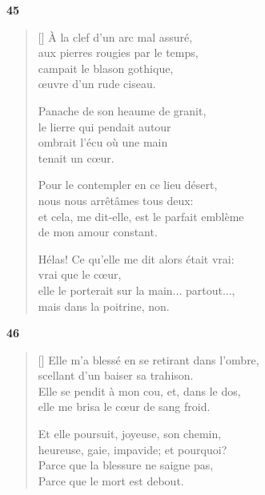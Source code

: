 \documentclass[a4paper,12pt]{book}
\begin{document}
\bigskip

\begin{center}
  \textbf{45}
\end{center}

\settowidth{\versewidth}{Panache de son heaume de granit,}

\begin{verse}[\versewidth]
  À la clef d'un arc mal assuré, \\
  aux pierres rougies par le temps, \\
  campait le blason gothique, \\
  œuvre d'un rude ciseau.

  Panache de son heaume de granit, \\
  le lierre qui pendait autour \\
  ombrait l'écu où une main \\
  tenait un cœur.

  Pour le contempler en ce lieu désert, \\
  nous nous arrêtâmes tous deux: \\
  et cela, me dit-elle, est le parfait emblème \\
  de mon amour constant.

  Hélas! Ce qu'elle me dit alors était vrai: \\
  vrai que le cœur, \\
  elle le porterait sur la main... partout..., \\
  mais dans la poitrine, non.
\end{verse}

\bigskip

\begin{center}
  \textbf{46}
\end{center}

\settowidth{\versewidth}{Elle m'a blessé en se retirant dans l'ombre,}

\begin{verse}[\versewidth]
  Elle m'a blessé en se retirant dans l'ombre, \\
  scellant d'un baiser sa trahison. \\
  Elle se pendit à mon cou, et, dans le dos, \\
  elle me brisa le cœur de sang froid.

  Et elle poursuit, joyeuse, son chemin, \\
  heureuse, gaie, impavide; et pourquoi? \\
  Parce que la blessure ne saigne pas, \\
  Parce que le mort est debout.
\end{verse}
\end{document}
